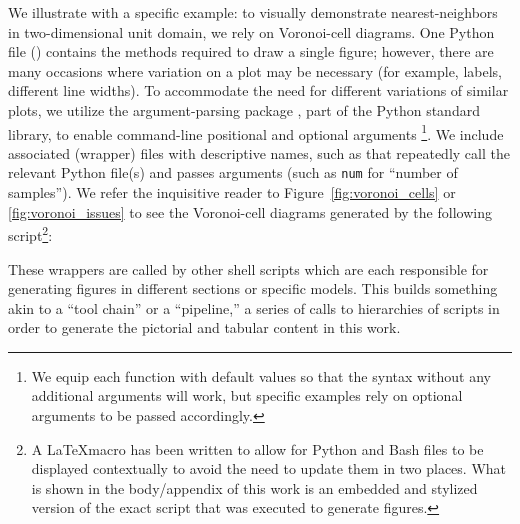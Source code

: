 We illustrate with a specific example: to visually demonstrate nearest-neighbors in two-dimensional unit domain, we rely on Voronoi-cell diagrams.
One Python file () contains the methods required to draw a single figure; however, there are many occasions where variation on a plot may be necessary (for example, labels, different line widths).
To accommodate the need for different variations of similar plots, we utilize the argument-parsing package , part of the Python standard library, to enable command-line positional and optional arguments \footnote{We equip each function with default values so that the syntax  without any additional arguments will work, but specific examples rely on optional arguments to be passed accordingly.}.
We include associated (wrapper) files with descriptive names, such as  that repeatedly call the relevant Python file(s) and passes arguments (such as {\tt num} for ``number of samples'').
We refer the inquisitive reader to  Figure~\ref{fig:voronoi_cells} or \ref{fig:voronoi_issues} to see the Voronoi-cell diagrams generated by the following script\footnote{A \LaTeX macro has been written to allow for Python and Bash files to be displayed contextually to avoid the need to update them in two places. What is shown in the body/appendix of this work is an embedded and stylized version of the exact script that was executed to generate figures.}:



These wrappers are called by other shell scripts which are each responsible for generating figures in different sections or specific models.
This builds something akin to a ``tool chain'' or a ``pipeline,'' a series of calls to hierarchies of scripts in order to generate the pictorial and tabular content in this work.

